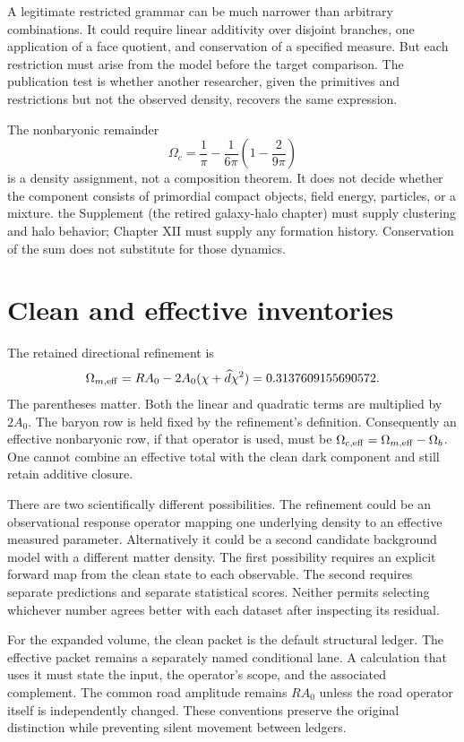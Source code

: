 A legitimate restricted grammar can be much narrower than arbitrary combinations. It could require linear additivity over disjoint branches, one application of a face quotient, and conservation of a specified measure. But each restriction must arise from the model before the target comparison. The publication test is whether another researcher, given the primitives and restrictions but not the observed density, recovers the same expression.

The nonbaryonic remainder
\begin{equation}
 \Omega_c=\frac1\pi-\frac1{6\pi}
 \left(1-\frac2{9\pi}\right)
 \label{c8:nonbaryon}
\end{equation}
is a density assignment, not a composition theorem. It does not decide whether the component consists of primordial compact objects, field energy, particles, or a mixture. the Supplement (the retired galaxy-halo chapter) must supply clustering and halo behavior; Chapter XII must supply any formation history. Conservation of the sum does not substitute for those dynamics.

\section{Clean and effective inventories}
The retained directional refinement is
\begin{equation}
 \Omega_{m,\rm eff}=RA_0-2A_0(\chi+\widehat d\chi^2)
 =0.3137609155690572.
 \label{c8:effective}
\end{equation}
The parentheses matter. Both the linear and quadratic terms are multiplied by $2A_0$. The baryon row is held fixed by the refinement's definition. Consequently an effective nonbaryonic row, if that operator is used, must be $\Omega_{c,\rm eff}=\Omega_{m,\rm eff}-\Omega_b$. One cannot combine an effective total with the clean dark component and still retain additive closure.

There are two scientifically different possibilities. The refinement could be an observational response operator mapping one underlying density to an effective measured parameter. Alternatively it could be a second candidate background model with a different matter density. The first possibility requires an explicit forward map from the clean state to each observable. The second requires separate predictions and separate statistical scores. Neither permits selecting whichever number agrees better with each dataset after inspecting its residual.

For the expanded volume, the clean packet is the default structural ledger. The effective packet remains a separately named conditional lane. A calculation that uses it must state the input, the operator's scope, and the associated complement. The common road amplitude remains $RA_0$ unless the road operator itself is independently changed. These conventions preserve the original distinction while preventing silent movement between ledgers.

